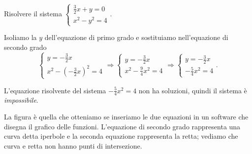 \begin{esempio}
Risolvere il sistema \(\left\{\begin{array}{l}\frac 3 
2x+y=0\\x^2-y^2=4\end{array}\right..\)

Isoliamo la \(y\) dell'equazione di primo grado e sostituiamo nell'equazione di 
secondo grado 
\[\left\{\begin{array}{l}y=-\frac 3 2x \\
x^2-\left(-\frac 3 2x\right)^2=4\end{array}\right.
\Rightarrow \left\{\begin{array}{l}y=-\frac 3 2x \\
x^2-\frac 9 4x^2=4\end{array}\right.
\Rightarrow \left\{\begin{array}{l}y=-\frac 3 2x\\
-\frac 5 4x^2=4\end{array}\right..\]

L'equazione risolvente del sistema \(-\frac 5 4x^2=4\) non ha soluzioni, quindi 
il 
sistema è \emph{impossibile}.
\begin{multicols}{2}
La figura è quella che otteniamo se inseriamo le due equazioni in un software 
che disegna il grafico delle funzioni. 
L'equazione di secondo grado rappresenta una curva detta iperbole e la seconda 
equazione rappresenta la retta; vediamo che curva e retta non hanno punti di 
intersezione.
\begin{center}

\end{center}
\end{multicols}
\end{esempio}

